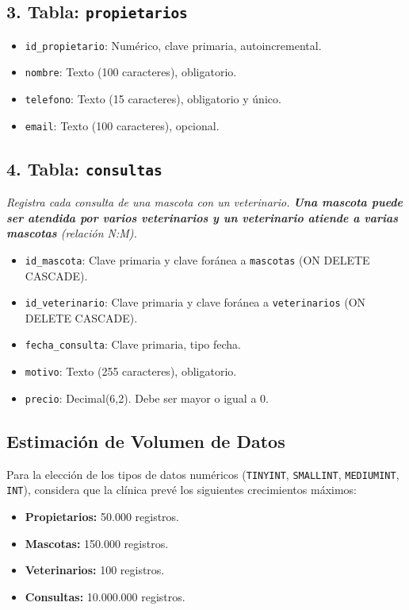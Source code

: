 \documentclass[a4paper,11pt]{article}
\begin{document}
\begin{Form}
\subsection*{3. Tabla: \texttt{propietarios}}
\begin{itemize}
    \item \texttt{id\_propietario}: Numérico, clave primaria, autoincremental.
    \item \texttt{nombre}: Texto (100 caracteres), obligatorio.
    \item \texttt{telefono}: Texto (15 caracteres), obligatorio y único.
    \item \texttt{email}: Texto (100 caracteres), opcional.
\end{itemize}


\subsection*{4. Tabla: \texttt{consultas}}
\textit{Registra cada consulta de una mascota con un veterinario. \textbf{Una mascota puede ser atendida por varios veterinarios y un veterinario atiende a varias mascotas} (relación N:M).}
\begin{itemize}
    \item \texttt{id\_mascota}: Clave primaria y clave foránea a \texttt{mascotas} (ON DELETE CASCADE). 
    \item \texttt{id\_veterinario}: Clave primaria y clave foránea a \texttt{veterinarios} (ON DELETE CASCADE). 
    \item \texttt{fecha\_consulta}: Clave primaria, tipo fecha.
    \item \texttt{motivo}: Texto (255 caracteres), obligatorio.
    \item \texttt{precio}: Decimal(6,2). Debe ser mayor o igual a 0. 
\end{itemize}


\subsection*{Estimación de Volumen de Datos}
Para la elección de los tipos de datos numéricos (\texttt{TINYINT}, \texttt{SMALLINT}, \texttt{MEDIUMINT}, \texttt{INT}), considera que la clínica prevé los siguientes crecimientos máximos:
\begin{itemize}
    \item \textbf{Propietarios:} 50.000 registros.
    \item \textbf{Mascotas:} 150.000 registros.
    \item \textbf{Veterinarios:} 100 registros.
    \item \textbf{Consultas:} 10.000.000 registros.
\end{itemize}


\end{Form}
\end{document}
